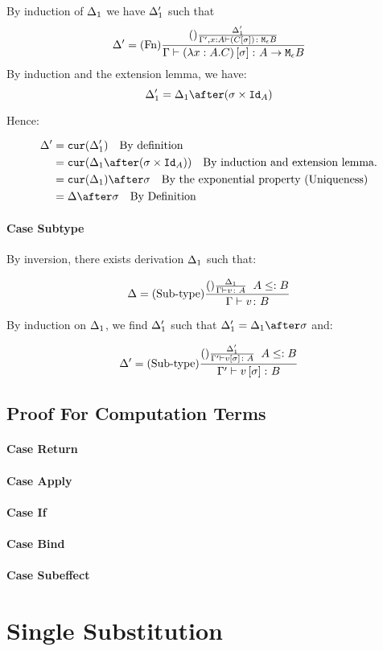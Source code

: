 \documentclass{report}
\begin{document}
By induction of $\Delta_1$ we have $\Delta_1'$ such that
\begin{equation}
    \Delta' = (\text{Fn}) \frac{
        (\text{}) \frac{\Delta_1'}{\Gamma', x:A \vdash (C\left[\sigma\right]) \colon \texttt{M}_{\epsilon}{B}}
    }{\Gamma \vdash (\lambda x : A. C)\left[\sigma\right] \colon A \rightarrow \texttt{M}_{\epsilon}{B}}
\end{equation}
By induction and the extension lemma, we have:
\begin{equation}
    \D_1' = \D_1\after(\si\times\Id{A})
\end{equation}

Hence:

\begin{align}
    \D' &= \cur{\D_1'}\qt{By definition}\\
        &= \cur{\D_1\after(\si\times\Id{A})}\qt{By induction and extension lemma.}\\
        & = \cur{\D_1}\after\si\qt{By the exponential property (Uniqueness)}\\
        &= \D\after\si\qt{By Definition}\\ 
\end{align}
\paragraph{Case Subtype}
By inversion, there exists derivation $\Delta_1$ such that:

\begin{equation}
    \Delta = (\text{Sub-type}) \frac{(\text{}) \frac{\Delta_1}{\Gamma \vdash v \colon A}\;\; A\leq: B}{\Gamma \vdash v \colon B}
\end{equation}

By induction on $\Delta_1$, we find $\Delta_1'$ such that $\D_1' = \D_1\after\si$ and:

\begin{equation}
    \Delta' = (\text{Sub-type}) \frac{(\text{}) \frac{\Delta_1'}{\Gamma' \vdash v\left[\sigma\right] \colon A}\;\; A\leq: B}{\Gamma' \vdash v\left[\sigma\right] \colon B}
\end{equation}
\subsection{Proof For Computation Terms}
\paragraph{Case Return}
\paragraph{Case Apply}
\paragraph{Case If}
\paragraph{Case Bind}
\paragraph{Case Subeffect}
\section{Single Substitution}
\end{document}
